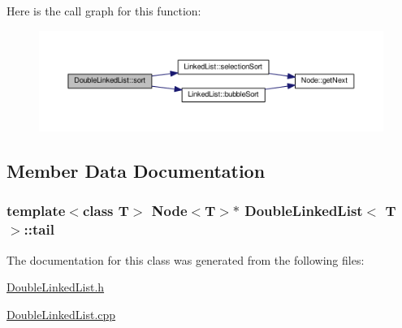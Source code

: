 Here is the call graph for this function\+:
\nopagebreak
\begin{figure}[H]
\begin{center}
\leavevmode
\includegraphics[width=350pt]{classDoubleLinkedList_aaaf8f24ea7fa8c66165d09015510b897_cgraph}
\end{center}
\end{figure}




\subsection{Member Data Documentation}
\subsubsection[{\texorpdfstring{tail}{tail}}]{\setlength{\rightskip}{0pt plus 5cm}template$<$class T$>$ {\bf Node}$<$T$>$$\ast$ {\bf Double\+Linked\+List}$<$ T $>$\+::tail\hspace{0.3cm}{\ttfamily [protected]}}\hypertarget{classDoubleLinkedList_aa9a7bf7a1c989e7a49781ac62d49982c}{}\label{classDoubleLinkedList_aa9a7bf7a1c989e7a49781ac62d49982c}


The documentation for this class was generated from the following files\+:\begin{DoxyCompactItemize}
\item 
\hyperlink{DoubleLinkedList_8h}{Double\+Linked\+List.\+h}\item 
\hyperlink{DoubleLinkedList_8cpp}{Double\+Linked\+List.\+cpp}\end{DoxyCompactItemize}
